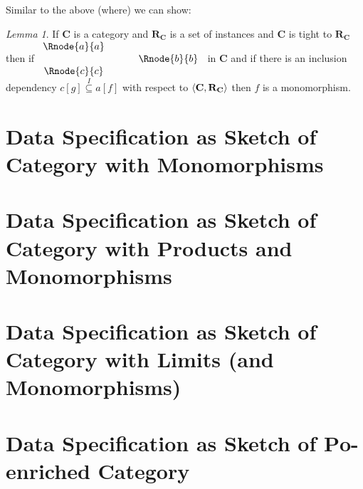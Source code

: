 \documentclass[10pt,a4paper]{article}
\theoremstyle{remark}
\newtheorem*{lemma*}{Lemma}
\newcommand{\catc}[1][C]{\textbf{#1}}
\newcommand{\reqt}{\textbf{R}}
\newcommand{\reqtc}[1][\catc]{\reqt_{#1}}
\newcommand{\Po}{\ensuremath{\textbf{Po}} }
\begin{document}
Similar to the above (where)  we can show:

\begin{lemma*}
If $\catc$ is a category and $\reqtc$ is a set of instances and $\catc$ is tight to $\reqtc$
then if $
\begin{array}{c p{0.5cm} c  }
\Rnode{a}{a} &&                \\[0.01cm] 
             &&   \Rnode{b}{b} \\[0.01cm]
\Rnode{c}{c}         
\end{array} 
$
in $\catc$ and if there is an inclusion dependency $c[g] \overset{I}{\subseteq} a[f]$ with respect to $\tuple{\catc,\reqtc}$ then $f$ is a monomorphism.
\end{lemma*}

\section*{Data Specification as Sketch of Category with  Monomorphisms}
\section*{Data Specification as Sketch of Category with Products and Monomorphisms}
\section*{Data Specification as Sketch of Category with Limits (and Monomorphisms)}
\section*{Data Specification as Sketch of $\Po$-enriched Category}
\end{document}
